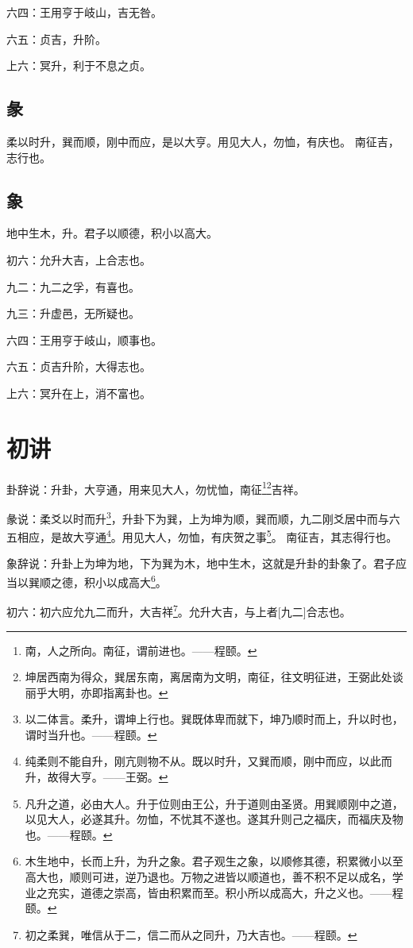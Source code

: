 \documentclass[12pt,oneside]{book}
\begin{document}
六四：王用亨于岐山，吉无咎。

六五：贞吉，升阶。

上六：冥升，利于不息之贞。


\subsection{彖}
柔以时升，巽而顺，刚中而应，是以大亨。用见大人，勿恤，有庆也。 南征吉，志行也。

\subsection{象}
地中生木，升。君子以顺德，积小以高大。

初六：允升大吉，上合志也。

九二：九二之孚，有喜也。

九三：升虚邑，无所疑也。

六四：王用亨于岐山，顺事也。

六五：贞吉升阶，大得志也。

上六：冥升在上，消不富也。

\section{初讲}
卦辞说：升卦，大亨通，用来见大人，勿忧恤，南征\footnote{南，人之所向。南征，谓前进也。——程颐。}\footnote{坤居西南为得众，巽居东南，离居南为文明，南征，往文明征进，王弼此处谈丽乎大明，亦即指离卦也。}吉祥。

彖说：柔爻以时而升\footnote{以二体言。柔升，谓坤上行也。巽既体卑而就下，坤乃顺时而上，升以时也，谓时当升也。——程颐。}，升卦下为巽，上为坤为顺，巽而顺，九二刚爻居中而与六五相应，是故大亨通\footnote{纯柔则不能自升，刚亢则物不从。既以时升，又巽而顺，刚中而应，以此而升，故得大亨。——王弼。}。用见大人，勿恤，有庆贺之事\footnote{凡升之道，必由大人。升于位则由王公，升于道则由圣贤。用巽顺刚中之道，以见大人，必遂其升。勿恤，不忧其不遂也。遂其升则己之福庆，而福庆及物也。——程颐。 }。 南征吉，其志得行也。

象辞说：升卦上为坤为地，下为巽为木，地中生木，这就是升卦的卦象了。君子应当以巽顺之德，积小以成高大\footnote{木生地中，长而上升，为升之象。君子观生之象，以顺修其德，积累微小以至高大也，顺则可进，逆乃退也。万物之进皆以顺道也，善不积不足以成名，学业之充实，道德之崇高，皆由积累而至。积小所以成高大，升之义也。——程颐。}。

初六：初六应允九二而升，大吉祥\footnote{初之柔巽，唯信从于二，信二而从之同升，乃大吉也。——程颐。}。允升大吉，与上者[九二]合志也。
\end{document}
